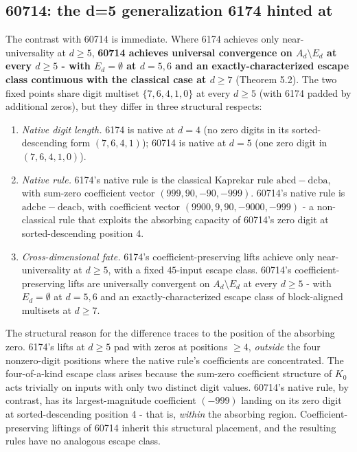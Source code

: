 \documentclass[11pt,letterpaper]{article}
\theoremstyle{paperstyle}
\theoremstyle{paperstyledef}
\theoremstyle{paperstylerem}
\begin{document}
\hypertarget{the-d5-generalization-6174-hinted-at}{%
\subsection{60714: the d=5 generalization 6174 hinted at}\label{the-d5-generalization-6174-hinted-at}}

The contrast with 60714 is immediate. Where 6174 achieves only
near-universality at \(d \geq 5\), \textbf{60714 achieves universal
convergence on \(A_d \setminus E_d\) at every \(d \geq 5\) - with
\(E_d = \emptyset\) at \(d = 5, 6\) and an exactly-characterized escape
class continuous with the classical case at \(d \geq 7\)} (Theorem 5.2).
The two fixed points share digit multiset \(\{7, 6, 4, 1, 0\}\) at every
\(d \geq 5\) (with 6174 padded by additional zeros), but they differ in
three structural respects:

\begin{enumerate}
\def\labelenumi{\arabic{enumi}.}
\item
  \emph{Native digit length.} 6174 is native at \(d = 4\) (no zero
  digits in its sorted-descending form \((7, 6, 4, 1)\)); 60714 is
  native at \(d = 5\) (one zero digit in \((7, 6, 4, 1, 0)\)).
\item
  \emph{Native rule.} 6174's native rule is the classical Kaprekar rule
  \(\mathrm{abcd} - \mathrm{dcba}\), with sum-zero coefficient vector
  \((999, 90, -90, -999)\). 60714's native rule is
  \(\mathrm{adcbe} - \mathrm{deacb}\), with coefficient vector
  \((9900, 9, 90, -9000, -999)\) - a non-classical rule that exploits
  the absorbing capacity of 60714's zero digit at sorted-descending
  position 4.
\item
  \emph{Cross-dimensional fate.} 6174's coefficient-preserving lifts
  achieve only near-universality at \(d \geq 5\), with a fixed
  \(45\)-input escape class. 60714's coefficient-preserving lifts are
  universally convergent on \(A_d \setminus E_d\) at every \(d \geq 5\)
  - with \(E_d = \emptyset\) at \(d = 5, 6\) and an
  exactly-characterized escape class of block-aligned multisets at
  \(d \geq 7\).
\end{enumerate}

The structural reason for the difference traces to the position of the
absorbing zero. 6174's lifts at \(d \geq 5\) pad with zeros at positions
\(\geq 4\), \emph{outside} the four nonzero-digit positions where the
native rule's coefficients are concentrated. The four-of-a-kind escape
class arises because the sum-zero coefficient structure of \(K_0\) acts
trivially on inputs with only two distinct digit values. 60714's native
rule, by contrast, has its largest-magnitude coefficient \((-999)\)
landing on its zero digit at sorted-descending position 4 - that is,
\emph{within} the absorbing region. Coefficient-preserving liftings of
60714 inherit this structural placement, and the resulting rules have no
analogous escape class.
\end{document}

